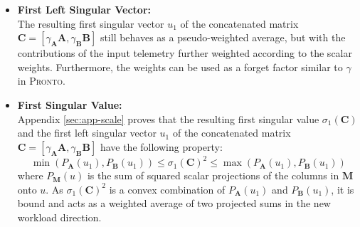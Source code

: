 \begin{itemize}
    \item \textbf{First Left Singular Vector:}\\
        The resulting first singular vector $u_1$ of the concatenated matrix $\mathbf{C} =
        [\gamma_{\mathbf{A}}\mathbf{A},
        \gamma_{\mathbf{\mathbf{B}}}\mathbf{\mathbf{B}}]$ still behaves as a
        pseudo-weighted average, but with the contributions of the input telemetry
        further weighted according to the scalar weights. Furthermore, the
        weights can be used as a forget factor similar to $\gamma$ in
        \textsc{Pronto}.
    \item \textbf{First Singular Value:}\\
        Appendix \ref{sec:app-scale} proves that the resulting first
        singular value $\sigma_1(\mathbf{C})$ and the first left singular vector
        $u_1$ of the concatenated matrix $\mathbf{C} =
        [\gamma_{\mathbf{A}}\mathbf{A}, \gamma_{\mathbf{B}}\mathbf{B}]$ have the
        following property:
        \[ \min(P_{\mathbf{A}}(u_1),P_{\mathbf{B}}(u_1))
        \leq \sigma_1(\mathbf{C})^2 \leq
        \max(P_{\mathbf{A}}(u_1),P_{\mathbf{B}}(u_1)) \]
        where $P_{\mathbf{M}}(u)$ is the sum of squared scalar projections of
        the columns in $\mathbf{M}$ onto $u$. As $\sigma_1(\mathbf{C})^2$ is a
        convex combination of $P_{\mathbf{A}}(u_1)$ and $P_{\mathbf{B}}(u_1)$,
        it is bound and acts as a weighted average of two projected sums in the
        new workload direction.
\end{itemize}

